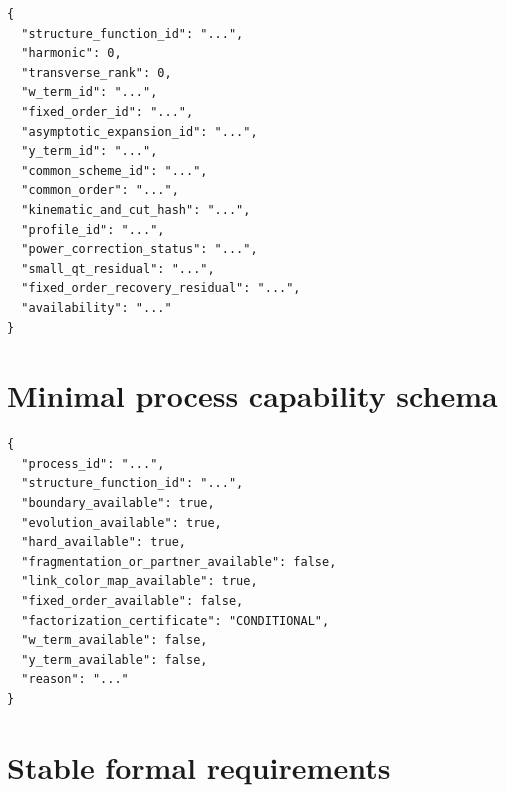 \documentclass[11pt]{article}
\begin{document}
\begin{verbatim}
{
  "structure_function_id": "...",
  "harmonic": 0,
  "transverse_rank": 0,
  "w_term_id": "...",
  "fixed_order_id": "...",
  "asymptotic_expansion_id": "...",
  "y_term_id": "...",
  "common_scheme_id": "...",
  "common_order": "...",
  "kinematic_and_cut_hash": "...",
  "profile_id": "...",
  "power_correction_status": "...",
  "small_qt_residual": "...",
  "fixed_order_recovery_residual": "...",
  "availability": "..."
}
\end{verbatim}

\section{Minimal process capability schema}
\label{app:capability-schema}

\begin{verbatim}
{
  "process_id": "...",
  "structure_function_id": "...",
  "boundary_available": true,
  "evolution_available": true,
  "hard_available": true,
  "fragmentation_or_partner_available": false,
  "link_color_map_available": true,
  "fixed_order_available": false,
  "factorization_certificate": "CONDITIONAL",
  "w_term_available": false,
  "y_term_available": false,
  "reason": "..."
}
\end{verbatim}

\section{Stable formal requirements}
\label{app:requirements}
\end{document}
